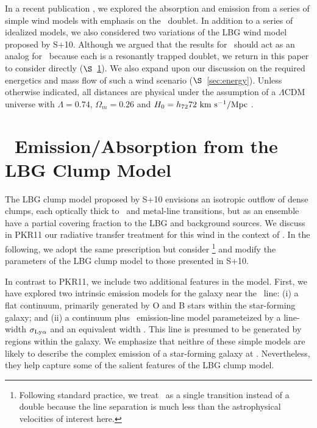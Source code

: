\documentclass[12pt,preprint]{aastex}
\begin{document}
In a recent publication \citep[][hereafter PKR11]{pkr11}, 
we explored the absorption and emission from
a series of simple wind models with emphasis on the
\mgiid\ doublet.  In addition to a
series of idealized models, we also considered two variations of the
LBG wind model proposed by S+10.  Although we argued that the results
for \mgii\ should act as an analog for \lya\ because each is a
resonantly trapped doublet, we return in this paper to consider
directly ($\S$~\ref{sec:lya}).  We also expand upon our discussion on the required
energetics and mass flow of such a wind scenario
($\S$~\ref{sec:energy}).  Unless otherwise indicated, all distances
are physical under the assumption of a $\Lambda$CDM universe with
$\Lambda = 0.74$, $\Omega_m = 0.26$ and 
$H_0 = h_{72} 72 \, \, {\rm km~s^{-1}}/{\rm Mpc}$ \citep{wmap05}.

\section{\lya\ Emission/Absorption from the LBG Clump Model}
\label{sec:lya}

The LBG clump model proposed by S+10 envisions an isotropic outflow of
dense clumps, each optically thick to \lya\ and metal-line
transitions, but as an ensemble have a partial covering fraction to
the LBG and background sources.  We discuss in PKR11 our radiative
transfer treatment for this wind in the context of \mgiid.  In the
following, we adopt the same prescription but consider
\lya\footnote{Following standard practice, we treat \lya\ as a single
  transition instead of a double because the line separation is much less
  than the astrophysical velocities of interest here.}
and modify the parameters of the LBG clump model to those presented in
S+10. 

In contrast to PKR11, we include two additional features in the
model.  First, we have explored two intrinsic emission models for the
galaxy near the \lya\ line: 
(i) a flat continuum, primarily generated by O and B stars within the
star-forming galaxy; and
(ii) a continuum plus \lya\ emission-line model parameteized by a
line-width $\sigma_{\rm Ly\alpha}$ and an equivalent width \wlya.
This line is presumed to be generated by  regions within the
galaxy.  We emphasize that neithre of these simple models are likely
to describe the complex emission of a star-forming galaxy at \lya.
Nevertheless, they help capture some of the salient features of the
LBG clump model.
\end{document}
